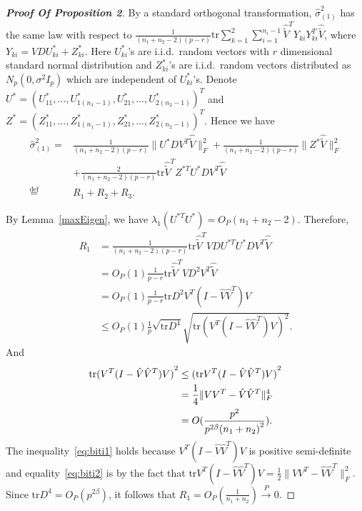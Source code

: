 
\begin{proof}[\textbf{Proof Of Proposition 2}]
    By a standard orthogonal transformation, $\hat{\sigma}_{(1)}^2$ has the same law with respect to $\frac{1}{(n_1+n_2-2)(p-r)}\mathrm{tr}\sum_{k=1}^2\sum_{i=1}^{n_i-1}\hat{\tilde{V}}^T Y_{ki}Y_{ki}^T\hat{\tilde{V}}$,
    where $Y_{ki}=VDU^{*}_{ki}+Z_{ki}^*$. Here
    $U_{ki}^{*}$'s are i.i.d.\ random vectors with $r$ dimensional standard normal distribution and $Z_{ki}^{*}$'s are i.i.d.\ random vectors distributed as  $N_p(0,\sigma^2 I_p)$ which are independent of $U_{ki}^{*}$'s.
    Denote $U^{*}={(U^*_{11},\ldots,U^{*}_{1(n_1-1)},U^*_{21},\ldots,U^*_{2(n_2-1)})}^T$ and 
    $Z^*={(Z^*_{11},\ldots,Z^*_{1(n_1-1)},Z^*_{21},\ldots,Z^*_{2(n_2-1)})}^T$. Hence we have
        \begin{align*}
            \hat{\sigma}_{(1)}^2=&\frac{1}{(n_1+n_2-2)(p-r)}\|U^*DV^T\hat{\tilde{V}}\|_F^2+\frac{1}{(n_1+n_2-2)(p-r)}\|Z^*\hat{\tilde{V}}\|^2_F \\
            &+\frac{2}{(n_1+n_2-2)(p-r)}\mathrm{tr}\hat{\tilde{V}}^T Z^{*T}U^*DV^T\hat{\tilde{V}}
            \\
            \overset{\textrm{def}}{=}&R_1+R_2+R_3.
        \end{align*}

    By Lemma~\ref{maxEigen}, we have $\lambda_1(U^{*T}U^*)=O_P(n_1+n_2-2)$. Therefore,
    \begin{equation}
        \begin{aligned}
            R_1&=\frac{1}{(n_1+n_2-2)(p-r)}\mathrm{tr}\hat{\tilde{V}}^T VDU^{*T}U^*DV^T\hat{\tilde{V}}\\
            &=O_P(1)\frac{1}{p-r}\mathrm{tr}\hat{\tilde{V}}^T VD^2V^T\hat{\tilde{V}}\\
            &=O_P(1)\frac{1}{p-r}\mathrm{tr} D^2V^T(I-\hat{V}\hat{V}^T)V\\
            &\leq O_P(1)\frac{1}{p}\sqrt{\mathrm{tr}D^4}\sqrt{\mathrm{tr}{(V^T(I-\hat{V}\hat{V}^T)V)}^2}.
        \end{aligned}
    \end{equation}
    And
    \begin{align}
        \mathrm{tr} {(V^T(I-\hat{V}\hat{V}^T)V)}^2
            &\leq {(\mathrm{tr} V^T(I-\hat{V}\hat{V}^T)V)}^2 \label{eq:biti1}\\
            &=\frac{1}{4}\|VV^T-\hat{V}\hat{V}^T\|_F^4 \label{eq:biti2}\\
            &=O(\frac{p^2}{p^{2\beta}{(n_1+n_2)}^2}).\notag
    \end{align}
    The inequality~\eqref{eq:biti1} holds because $V^T(I-\hat{V}\hat{V}^T)V$ is positive semi-definite and equality~\eqref{eq:biti2} is by the fact that $\mathrm{tr} V^T(I-\hat{V}\hat{V}^T)V=\frac{1}{2}\|VV^T-\hat{V}\hat{V}^T\|^2_F$. 
    Since $\mathrm{tr}D^4=O_P(p^{2\beta})$, it follows that $R_1=O_P(\frac{1}{n_1+n_2})\xrightarrow{P}0$.


\end{proof}
